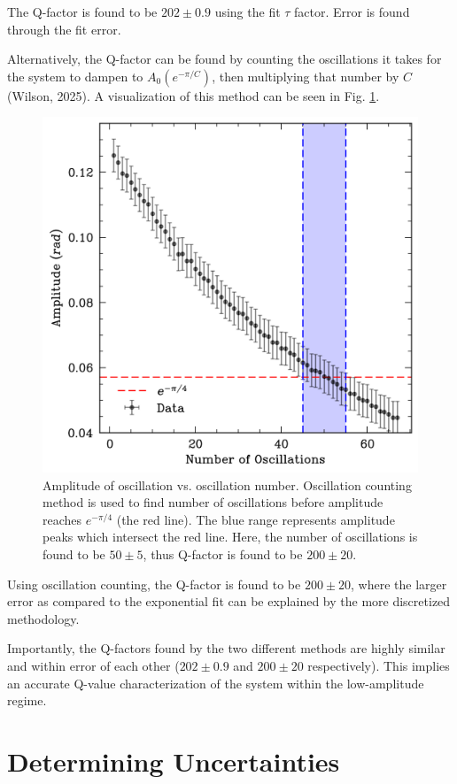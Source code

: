 \documentclass[prl,twocolumn,amsmath,amssymb,superscriptaddress]{revtex4-2}
\begin{document}
The Q-factor is found to be $202\pm0.9$ using the fit $\tau$ factor. Error is found through the fit error.

Alternatively, the Q-factor can be found by counting the oscillations it takes for the system to dampen to $A_0(e^{-\pi/C})$, then multiplying that number by $C$ (Wilson, 2025). A visualization of this method can be seen in Fig. \ref{fig:count_q}.

\begin{figure}[htb]
    \hspace{-20pt}
    \includegraphics[width=0.8\linewidth]{count_decay.png}
    \caption{Amplitude of oscillation vs. oscillation number. Oscillation counting method is used to find number of oscillations before amplitude reaches $e^{-\pi/4}$ (the red line). The blue range represents amplitude peaks which intersect the red line. Here, the number of oscillations is found to be $50\pm5$, thus Q-factor is found to be $200\pm20$.}
    \label{fig:count_q}
\end{figure}

Using oscillation counting, the Q-factor is found to be $200\pm20$, where the larger error as compared to the exponential fit can be explained by the more discretized methodology.

Importantly, the Q-factors found by the two different methods are highly similar and within error of each other ($202\pm0.9$ and $200\pm20$ respectively). This implies an accurate Q-value characterization of the system within the low-amplitude regime.

\vspace{64pt}
\section{Determining Uncertainties}
\end{document}
